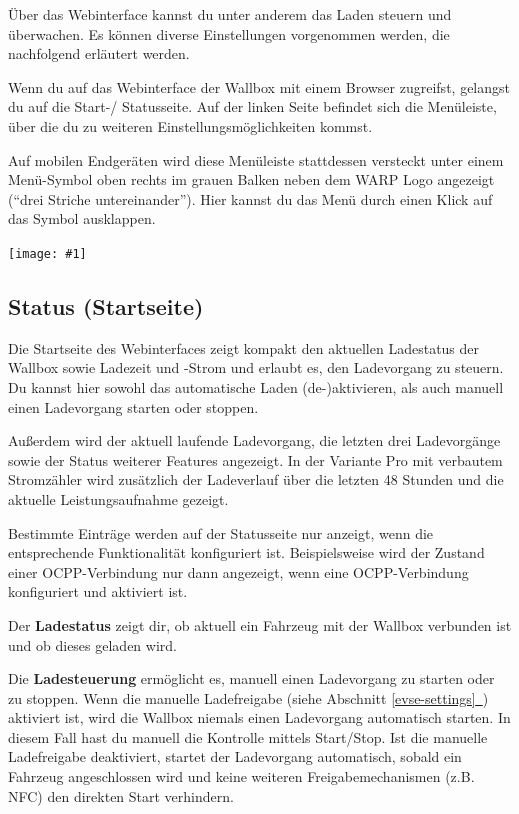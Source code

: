 \documentclass[a4paper,10pt]{article}
\newcommand{\gfx}[1]{\texttt{[image: \#1]}}
\newcommand*{\fullref}[1]{Abschnitt \hyperref[{#1}]{\ref*{#1}~\nameref*{#1}}}
\begin{document}
\begin{multicols*}{2}
    Über das Webinterface kannst du unter anderem das Laden steuern und überwachen.
    Es können diverse Einstellungen vorgenommen werden, die nachfolgend
    erläutert werden.

    Wenn du auf das Webinterface der Wallbox mit einem Browser zugreifst,
    gelangst du auf die Start-/ Statusseite. Auf der linken Seite befindet sich
    die Menüleiste, über die du zu weiteren Einstellungsmöglichkeiten kommst.

    Auf mobilen Endgeräten wird
    diese Menüleiste stattdessen versteckt unter einem Menü-Symbol oben rechts
    im grauen Balken neben dem WARP Logo angezeigt (\enquote{drei Striche untereinander}).
    Hier kannst du das Menü durch einen Klick auf das Symbol ausklappen.

    \gfx{./img_warp2/resized/web_status}

    \subsection{Status (Startseite)}

    Die Startseite des Webinterfaces zeigt kompakt den aktuellen Ladestatus der
    Wallbox sowie Ladezeit und -Strom und erlaubt es, den Ladevorgang zu steuern.
    Du kannst hier sowohl das automatische Laden (de-)aktivieren, als auch
    manuell einen Ladevorgang starten oder stoppen.

    Außerdem wird der aktuell laufende Ladevorgang, die letzten drei
    Ladevorgänge sowie der Status weiterer Features angezeigt.
    In der Variante Pro mit verbautem Stromzähler wird zusätzlich der Ladeverlauf
    über die letzten 48 Stunden und die aktuelle Leistungsaufnahme gezeigt.

    Bestimmte Einträge werden auf der Statusseite nur anzeigt, wenn die entsprechende
    Funktionalität konfiguriert ist. Beispielsweise wird der Zustand einer OCPP-Verbindung
    nur dann angezeigt, wenn eine OCPP-Verbindung konfiguriert und aktiviert ist.

    Der \textbf{Ladestatus} zeigt dir, ob aktuell ein
    Fahrzeug mit der Wallbox verbunden ist und ob dieses geladen wird.

    Die \textbf{Ladesteuerung} ermöglicht es, manuell einen Ladevorgang zu
    starten oder zu stoppen. Wenn die manuelle Ladefreigabe (siehe \fullref{evse-settings}) aktiviert ist, wird die
    Wallbox niemals einen Ladevorgang automatisch starten. In diesem Fall hast du
    manuell die Kontrolle mittels Start/Stop. Ist die manuelle Ladefreigabe deaktiviert,
    startet der Ladevorgang automatisch, sobald ein Fahrzeug
    angeschlossen wird und keine weiteren Freigabemechanismen (z.B. NFC) den
    direkten Start verhindern.


\end{multicols*}
\end{document}
